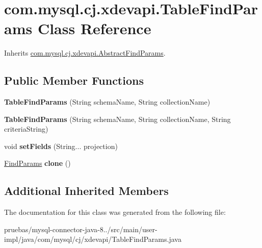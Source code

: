 \hypertarget{classcom_1_1mysql_1_1cj_1_1xdevapi_1_1_table_find_params}{}\section{com.\+mysql.\+cj.\+xdevapi.\+Table\+Find\+Params Class Reference}
\label{classcom_1_1mysql_1_1cj_1_1xdevapi_1_1_table_find_params}


Inherits \mbox{\hyperlink{classcom_1_1mysql_1_1cj_1_1xdevapi_1_1_abstract_find_params}{com.\+mysql.\+cj.\+xdevapi.\+Abstract\+Find\+Params}}.

\subsection*{Public Member Functions}
\begin{DoxyCompactItemize}
\item 
\mbox{\label{classcom_1_1mysql_1_1cj_1_1xdevapi_1_1_table_find_params_a9219160b4d3eff0893ca5ec7c69d67b9}} 
{\bfseries Table\+Find\+Params} (String schema\+Name, String collection\+Name)
\item 
\mbox{\label{classcom_1_1mysql_1_1cj_1_1xdevapi_1_1_table_find_params_a147c8ae664bdb6b463cbd1d73ad0cc8e}} 
{\bfseries Table\+Find\+Params} (String schema\+Name, String collection\+Name, String criteria\+String)
\item 
\mbox{\label{classcom_1_1mysql_1_1cj_1_1xdevapi_1_1_table_find_params_a94e20b606a6c17ac6990fab5c212555b}} 
void {\bfseries set\+Fields} (String... projection)
\item 
\mbox{\label{classcom_1_1mysql_1_1cj_1_1xdevapi_1_1_table_find_params_a5c3b902bd92cc129bd45fc65edb682c7}} 
\mbox{\hyperlink{interfacecom_1_1mysql_1_1cj_1_1xdevapi_1_1_find_params}{Find\+Params}} {\bfseries clone} ()
\end{DoxyCompactItemize}
\subsection*{Additional Inherited Members}


The documentation for this class was generated from the following file\+:\begin{DoxyCompactItemize}
\item 
pruebas/mysql-\/connector-\/java-\/8../src/main/user-\/impl/java/com/mysql/cj/xdevapi/Table\+Find\+Params.\+java\end{DoxyCompactItemize}
